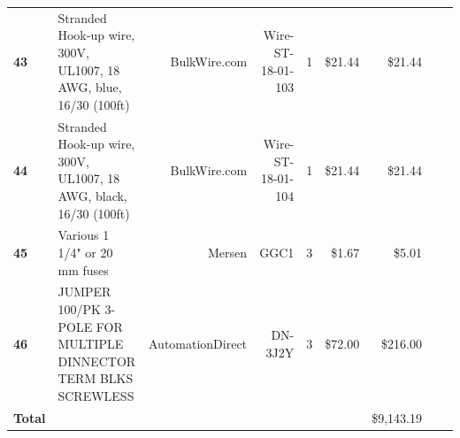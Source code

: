 \begin{table}[!htp]
{\begin{tabular}{llrrrrrrr}
      \textbf{43}    & Stranded Hook-up wire, 300V, UL1007, 18 AWG, blue, 16/30 (100ft)                 & BulkWire.com      & Wire-ST-18-01-103 & 1        & \$21.44  & \$21.44        \\
      \textbf{44}    & Stranded Hook-up wire, 300V, UL1007, 18 AWG, black, 16/30 (100ft)                & BulkWire.com      & Wire-ST-18-01-104 & 1        & \$21.44  & \$21.44        \\
      \textbf{45}    & Various 1 1/4" or 20 mm fuses                                                    & Mersen            & GGC1              & 3        & \$1.67   & \$5.01         \\
      \textbf{46}    & JUMPER 100/PK 3-POLE FOR MULTIPLE DINNECTOR TERM BLKS SCREWLESS                  & AutomationDirect  & DN-3J2Y           & 3        & \$72.00  & \$216.00       \\
      \textbf{Total} &                                                                                  &                   &                   &          &          & \$9,143.19     \\
      \bottomrule
    \end{tabular}
  }
\end{table}
